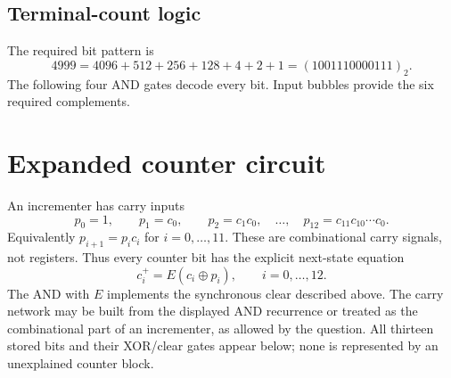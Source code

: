 \subsection{Terminal-count logic}
The required bit pattern is
\[
4999=4096+512+256+128+4+2+1=(1001110000111)_2.
\]
The following four AND gates decode every bit. Input bubbles provide the
six required complements.
\begin{center}
\end{center}

\clearpage
\section{Expanded counter circuit}
An incrementer has carry inputs
\[
p_0=1,\qquad p_1=c_0,\qquad
p_2=c_1c_0,\quad \ldots,\quad
p_{12}=c_{11}c_{10}\cdots c_0.
\]
Equivalently \(p_{i+1}=p_i c_i\) for \(i=0,\ldots,11\).
These are combinational carry signals, not registers. Thus every counter
bit has the explicit next-state equation
\[
\boxed{c_i^+=E(c_i\mathbin{\oplus}p_i),\qquad i=0,\ldots,12.}
\]
The AND with \(E\) implements the synchronous clear described above.
The carry network may be built from the displayed AND recurrence or
treated as the combinational part of an incrementer, as allowed by the
question. All thirteen stored bits and their XOR/clear gates appear
below; none is represented by an unexplained counter block.

